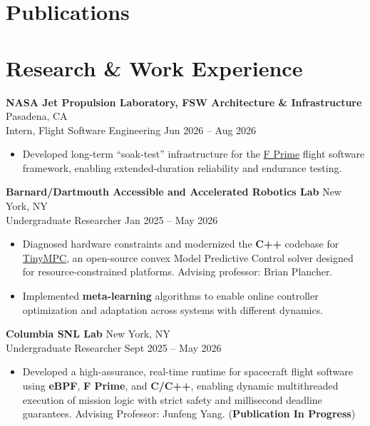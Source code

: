\documentclass[a4paper,12pt]{article}
\newenvironment{joblong}[4]
    {
    \noindent\textbf{#1} \dotfill #2 \\
    \noindent #3 \dotfill #4 \\[3.75pt]
    \begin{minipage}[t]{\linewidth}
    \begin{itemize}[nosep,after=\strut, leftmargin=1em, itemsep=3pt,label=--]
    }
    {
    \end{itemize}
    \end{minipage}    
    }
\begin{document}
\section{Publications}
\begin{refsection}
\nocite{*}
\printbibliography[heading=none]
\end{refsection}


\section{Research \& Work Experience}

\begin{joblong}{NASA Jet Propulsion Laboratory, FSW Architecture \& Infrastructure }{Pasadena, CA}{Intern, Flight Software Engineering}{Jun 2026 -- Aug 2026}
\item Developed long-term ``soak-test'' infrastructure for the \href{https://fprime.jpl.nasa.gov/}{F Prime} flight software framework, enabling extended-duration reliability and endurance testing.
\end{joblong}

\begin{joblong}{Barnard/Dartmouth Accessible and Accelerated Robotics Lab}{New York, NY}{Undergraduate Researcher}{Jan 2025 -- May 2026}
\item Diagnosed hardware constraints and modernized the \textbf{C++} codebase for \href{https://tinympc.org/}{TinyMPC}, an open-source convex Model Predictive Control solver designed for resource-constrained platforms. Advising professor: Brian Plancher.
\item Implemented \textbf{meta-learning} algorithms to enable online controller optimization and adaptation across systems with different dynamics.
\end{joblong}

\begin{joblong}{Columbia SNL Lab}{New York, NY}{Undergraduate Researcher}{Sept 2025 -- May 2026}
\item Developed a high-assurance, real-time runtime for spacecraft flight software using \textbf{eBPF}, \textbf{F Prime}, and \textbf{C/C++}, enabling dynamic multithreaded execution of mission logic with strict safety and millisecond deadline guarantees. Advising Professor: Junfeng Yang. (\textbf{Publication In Progress}) 
\end{joblong}
\end{document}
